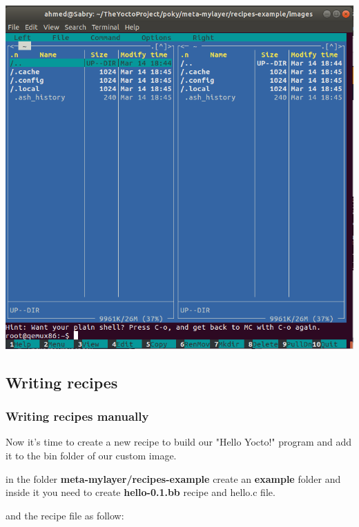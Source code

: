 \documentclass{article}
\begin{document}
\begin{center}
  \includegraphics[scale=0.50]{./resources/img/image-with-mc-command.png}
\end{center}

\subsection{Writing recipes}  
\subsubsection{Writing recipes manually}
Now it's time to create a new recipe to build our "Hello Yocto!" program and add it to the bin folder of our custom image.
  
in the folder \textbf{ meta-mylayer/recipes-example} create an \textbf{example} folder and inside it you need to create \textbf{hello-0.1.bb} recipe and hello.c file.



and the recipe file as follow:




  
\end{document}
